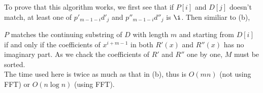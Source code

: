 \documentclass{6046}
\begin{document}
To prove that this algorithm works, 
we first see that if $P[i]$ and $D[j]$ 
doesn't match, 
at least one of $p'_{m-1-i}d'_j$ and $p''_{m-1-i}d''_j$ is $\i$. 
Then similiar to (b), 

$P$ matches the continuing substring of $D$ 
with length $m$ and starting from $D[i]$ 
if and only if 
the coefficients of $x^{i+m-1}$ in both
$R'(x)$ and $R''(x)$ has no imaginary part. 
As we chack the coefficients of $R'$ and $R''$ one by one, 
$M$ must be sorted. 
\\

The time used here is twice as much as that in (b), 
thus is $O(mn)$ (not using FFT) or $O(n\log{n})$ (using FFT). 
\end{document}
